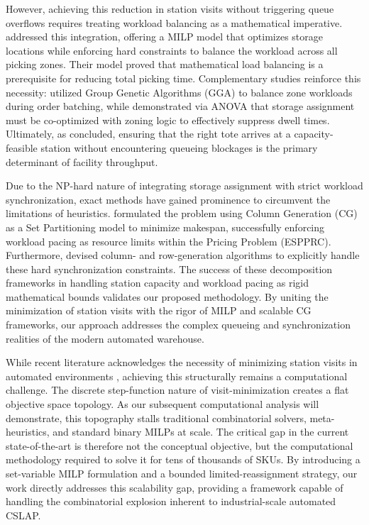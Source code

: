 \documentclass[preprint,review,11pt,authoryear]{elsarticle}
\begin{document}
However, achieving this reduction in station visits without triggering queue overflows requires treating workload balancing as a mathematical imperative. \citet{tarczynski2023} addressed this integration, offering a MILP model that optimizes storage locations while enforcing hard constraints to balance the workload across all picking zones. Their model proved that mathematical load balancing is a prerequisite for reducing total picking time. Complementary studies reinforce this necessity: \citet{pan2015} utilized Group Genetic Algorithms (GGA) to balance zone workloads during order batching, while \citet{vanGils2018} demonstrated via ANOVA that storage assignment must be co-optimized with zoning logic to effectively suppress dwell times. Ultimately, as \citet{boysen2023} concluded, ensuring that the right tote arrives at a capacity-feasible station without encountering queueing blockages is the primary determinant of facility throughput.

Due to the NP-hard nature of integrating storage assignment with strict workload synchronization, exact methods have gained prominence to circumvent the limitations of heuristics. \citet{muter2022} formulated the problem using Column Generation (CG) as a Set Partitioning model to minimize makespan, successfully enforcing workload pacing as resource limits within the Pricing Problem (ESPPRC). Furthermore, \citet{zhen2025} devised column- and row-generation algorithms to explicitly handle these hard synchronization constraints. The success of these decomposition frameworks in handling station capacity and workload pacing as rigid mathematical bounds validates our proposed methodology. By uniting the minimization of station visits with the rigor of MILP and scalable CG frameworks, our approach addresses the complex queueing and synchronization realities of the modern automated warehouse. 

While recent literature acknowledges the necessity of minimizing station visits in automated environments \cite{xie2021, tarczynski2023}, achieving this structurally remains a computational challenge. The discrete step-function nature of visit-minimization creates a flat objective space topology. As our subsequent computational analysis will demonstrate, this topography stalls traditional combinatorial solvers, meta-heuristics, and standard binary MILPs at scale. The critical gap in the current state-of-the-art is therefore not the conceptual objective, but the computational methodology required to solve it for tens of thousands of SKUs. By introducing a set-variable MILP formulation and a bounded limited-reassignment strategy, our work directly addresses this scalability gap, providing a framework capable of handling the combinatorial explosion inherent to industrial-scale automated CSLAP.
\end{document}
